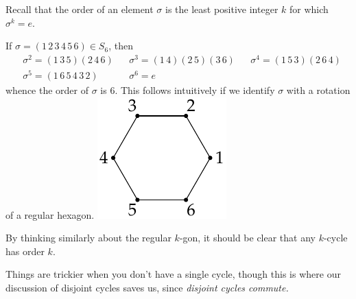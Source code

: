 
Recall that the order of an element $\sigma$ is the least positive integer $k$ for which $\sigma^k=e$.

\begin{example}[lower separated=false, sidebyside, sidebyside align=top seam, sidebyside gap=0pt, righthand width=0.22\linewidth]{}{}
If $\sigma=(1\,2\,3\,4\,5\,6)\in S_6$, then
\begin{align*}
&\sigma^2=(1\,3\,5)(2\,4\,6) &&\sigma^3=(1\,4)(2\,5)(3\,6) &&\sigma^4=(1\,5\,3)(2\,6\,4)\\
&\sigma^5=(1\,6\,5\,4\,3\,2) &&\sigma^6=e&&
\end{align*}
whence the order of $\sigma$ is 6. This follows intuitively if we identify $\sigma$ with a rotation of a regular hexagon. 
\tcblower
\flushright\includegraphics{perm-hexagon}
\end{example}

By thinking similarly about the regular $k$-gon, it should be clear that any $k$-cycle has order $k$.

\goodbreak

Things are trickier when you don't have a single cycle, though this is where our discussion of disjoint cycles saves us, since \emph{disjoint cycles commute.}

